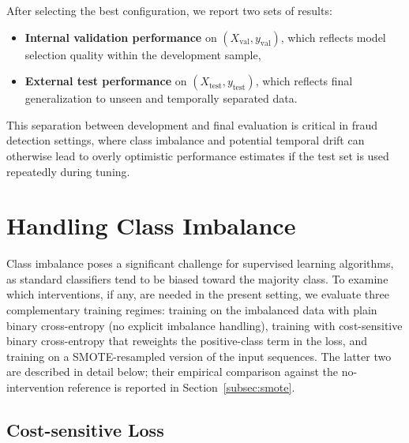 \documentclass[oneside,12pt,parskip=half,american,numbers=noenddot]{scrreprt}
\begin{document}
After selecting the best configuration, we report two sets of results:
\begin{itemize}
    \item \textbf{Internal validation performance} on \((X_{\text{val}}, y_{\text{val}})\), which reflects model selection quality within the development sample,
    \item \textbf{External test performance} on \((X_{\text{test}}, y_{\text{test}})\), which reflects final generalization to unseen and temporally separated data.
\end{itemize}
This separation between development and final evaluation is critical in fraud detection settings, where class imbalance and potential temporal drift can otherwise lead to overly optimistic performance estimates if the test set is used repeatedly during tuning.

\section{Handling Class Imbalance}
\label{sec:imbalance}

Class imbalance poses a significant challenge for supervised learning algorithms, as standard classifiers tend to be biased toward the majority class. To examine which interventions, if any, are needed in the present setting, we evaluate three complementary training regimes: training on the imbalanced data with plain binary cross-entropy (no explicit imbalance handling), training with cost-sensitive binary cross-entropy that reweights the positive-class term in the loss, and training on a SMOTE-resampled version of the input sequences. The latter two are described in detail below; their empirical comparison against the no-intervention reference is reported in Section~\ref{subsec:smote}.

\subsection{Cost-sensitive Loss}
\label{subsec:cost_sensitive_loss}
\end{document}
